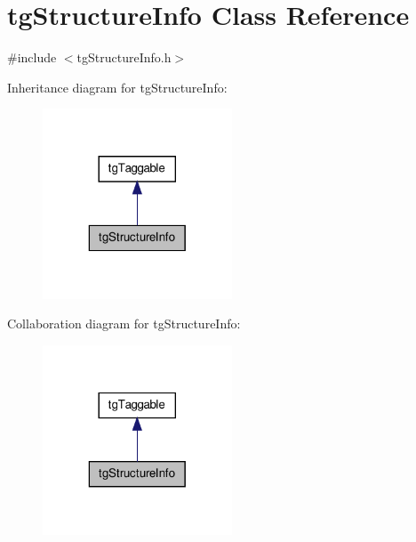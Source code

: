 \hypertarget{classtg_structure_info}{\section{tg\-Structure\-Info Class Reference}
\label{classtg_structure_info}
}


{\ttfamily \#include $<$tg\-Structure\-Info.\-h$>$}



Inheritance diagram for tg\-Structure\-Info\-:\nopagebreak
\begin{figure}[H]
\begin{center}
\leavevmode
\includegraphics[width=160pt]{classtg_structure_info__inherit__graph}
\end{center}
\end{figure}


Collaboration diagram for tg\-Structure\-Info\-:\nopagebreak
\begin{figure}[H]
\begin{center}
\leavevmode
\includegraphics[width=160pt]{classtg_structure_info__coll__graph}
\end{center}
\end{figure}
